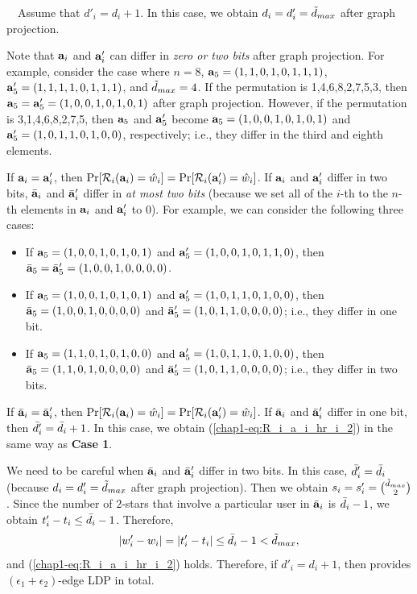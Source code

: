 {\smallskip
{}~~Assume that $d'_i = d_i + 1$. 
In this case, we obtain $d_i = d'_i = \tilde{d}_{max}$ after graph projection. 

Note that $\mathbf{a}_i$ and $\mathbf{a}'_i$ can differ in \textit{zero or two bits} after graph projection. 
For example, consider the case where $n=8$, $\mathbf{a}_5=(1,1,0,1,0,1,1,1)$, $\mathbf{a}'_5=(1,1,1,1,0,1,1,1)$, and $\tilde{d}_{max}=4$. 
If the permutation is 1,4,6,8,2,7,5,3, then $\mathbf{a}_5=\mathbf{a}'_5=(1,0,0,1,0,1,0,1)$ after graph projection. 
However, if the permutation is 3,1,4,6,8,2,7,5, then $\mathbf{a}_5$ and $\mathbf{a}'_5$ become $\mathbf{a}_5=(1,0,0,1,0,1,0,1)$ and $\mathbf{a}'_5=(1,0,1,1,0,1,0,0)$, respectively; i.e., they differ in the third and eighth elements. 

If $\mathbf{a}_i=\mathbf{a}'_i$, then $\Pr[\mathcal{R}_i(\mathbf{a}_i) = \hat{w}_i] = \Pr[\mathcal{R}_i(\mathbf{a}'_i) = \hat{w}_i]$. 
If $\mathbf{a}_i$ and $\mathbf{a}'_i$ differ in two bits, $\bar{\mathbf{a}}_i$ and $\bar{\mathbf{a}}'_i$ differ in \textit{at most two bits} (because we set all of the $i$-th to the $n$-th elements in $\mathbf{a}_i$ and $\mathbf{a}'_i$ to $0$). 
For example, we can consider the following three cases:
\begin{itemize}
    \item If $\mathbf{a}_5=(1,0,0,1,0,1,0,1)$ and $\mathbf{a}'_5=(1,0,0,1,0,1,1,0)$, then $\bar{\mathbf{a}}_5=\bar{\mathbf{a}}'_5=(1,0,0,1,0,0,0,0)$. 
    \item If $\mathbf{a}_5=(1,0,0,1,0,1,0,1)$ and $\mathbf{a}'_5=(1,0,1,1,0,1,0,0)$, then $\bar{\mathbf{a}}_5=(1,0,0,1,0,0,0,0)$ and $\bar{\mathbf{a}}'_5=(1,0,1,1, 0,0,\allowbreak0,0)$; i.e., they differ in one bit. 
    \item If $\mathbf{a}_5=(1,1,0,1,0,1,0,0)$ and $\mathbf{a}'_5=(1,0,1,1,0,1,0,0)$, then $\bar{\mathbf{a}}_5=(1,1,0,1,0,0,0,0)$ and $\bar{\mathbf{a}}'_5=(1,0,1,1,0,0,\allowbreak0,0)$; i.e., they differ in two bits.
\end{itemize}
If $\bar{\mathbf{a}}_i=\bar{\mathbf{a}}'_i$, then $\Pr[\mathcal{R}_i(\mathbf{a}_i) = \hat{w}_i] = \Pr[\mathcal{R}_i(\mathbf{a}'_i) = \hat{w}_i]$. 
If $\bar{\mathbf{a}}_i$ and $\bar{\mathbf{a}}'_i$ differ in one bit, then $\bar{d}'_i = \bar{d}_i + 1$. 
In this case, we obtain (\ref{chap1-eq:R_i_a_i_hr_i_2}) in the same way as \textbf{Case 1}. 

We need to be careful when $\bar{\mathbf{a}}_i$ and $\bar{\mathbf{a}}'_i$ differ in two bits. 
In this case, $\bar{d}'_i = \bar{d}_i$ (because $d_i = d'_i = \tilde{d}_{max}$ after graph projection). 
Then we obtain $s_i = s'_i = \binom{\tilde{d}_{max}}{2}$. 
Since the number of $2$-stars that involve a particular user in $\bar{\mathbf{a}}_i$ is $\bar{d}_i - 1$, we obtain $t'_i - t_i \leq \bar{d}_i - 1$. Therefore,
\begin{align*}
|w'_i - w_i| = |t'_i - t_i| \leq \bar{d}_i - 1 < \tilde{d}_{max},
\end{align*}
and (\ref{chap1-eq:R_i_a_i_hr_i_2}) holds. 
Therefore, if $d'_i = d_i + 1$, then 
 provides $(\epsilon_1 + \epsilon_2)$-edge LDP in total. 

}
